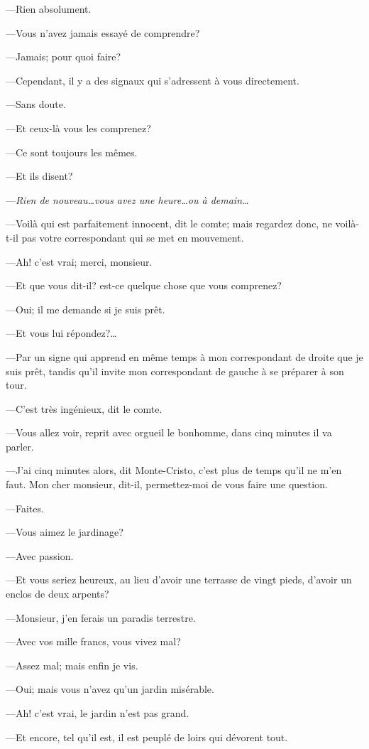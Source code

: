 —Rien absolument. 

—Vous n'avez jamais essayé de comprendre? 

—Jamais; pour quoi faire? 

—Cependant, il y a des signaux qui s'adressent à vous directement. 

—Sans doute. 

—Et ceux-là vous les comprenez? 

—Ce sont toujours les mêmes. 

—Et ils disent? 

—\textit{Rien de nouveau\dots vous avez une heure\dots ou à demain\dots} 

—Voilà qui est parfaitement innocent, dit le comte; mais regardez donc, ne voilà-t-il pas votre correspondant qui se met en mouvement. 

—Ah! c'est vrai; merci, monsieur. 

—Et que vous dit-il? est-ce quelque chose que vous comprenez? 

—Oui; il me demande si je suis prêt. 

—Et vous lui répondez?\dots 

—Par un signe qui apprend en même temps à mon correspondant de droite que je suis prêt, tandis qu'il invite mon correspondant de gauche à se préparer à son tour.  

—C'est très ingénieux, dit le comte. 

—Vous allez voir, reprit avec orgueil le bonhomme, dans cinq minutes il va parler. 

—J'ai cinq minutes alors, dit Monte-Cristo, c'est plus de temps qu'il ne m'en faut. Mon cher monsieur, dit-il, permettez-moi de vous faire une question. 

—Faites. 

—Vous aimez le jardinage? 

—Avec passion. 

—Et vous seriez heureux, au lieu d'avoir une terrasse de vingt pieds, d'avoir un enclos de deux arpents? 

—Monsieur, j'en ferais un paradis terrestre. 

—Avec vos mille francs, vous vivez mal? 

—Assez mal; mais enfin je vis. 

—Oui; mais vous n'avez qu'un jardin misérable. 

—Ah! c'est vrai, le jardin n'est pas grand. 

—Et encore, tel qu'il est, il est peuplé de loirs qui dévorent tout. 

